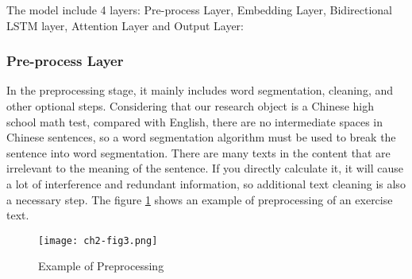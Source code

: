 The model include 4 layers: Pre-process Layer, Embedding Layer, Bidirectional LSTM layer, Attention Layer and Output Layer:
\subsubsection{Pre-process Layer}




In the preprocessing stage, it mainly includes word segmentation, cleaning, and other optional steps. Considering that our research object is a Chinese high school math test, compared with English, there are no intermediate spaces in Chinese sentences, so a word segmentation algorithm must be used to break the sentence into word segmentation. There are many texts in the content that are irrelevant to the meaning of the sentence. If you directly calculate it, it will cause a lot of interference and redundant information, so additional text cleaning is also a necessary step. The figure \ref{ch2-fig3} shows an example of preprocessing of an exercise text.

\begin{figure}[h]
	\centering
	\texttt{[image: ch2-fig3.png]}
	\caption{Example of Preprocessing}
	\label{ch2-fig3}
\end{figure}


